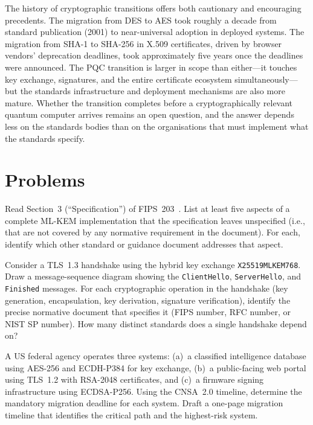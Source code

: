 The history of cryptographic transitions offers both cautionary and encouraging precedents. The migration from DES to AES took roughly a decade from standard publication (2001) to near-universal adoption in deployed systems. The migration from SHA-1 to SHA-256 in X.509 certificates, driven by browser vendors' deprecation deadlines, took approximately five years once the deadlines were announced. The PQC transition is larger in scope than either---it touches key exchange, signatures, and the entire certificate ecosystem simultaneously---but the standards infrastructure and deployment mechanisms are also more mature. Whether the transition completes before a cryptographically relevant quantum computer arrives remains an open question, and the answer depends less on the standards bodies than on the organisations that must implement what the standards specify.


\section*{Problems}

\begin{prob}
\label{prob:fips203-unspecified}
Read Section~3 (``Specification'') of FIPS~203~\cite{FIPS203}. List at least five aspects of a complete ML-KEM implementation that the specification leaves unspecified (i.e., that are not covered by any normative requirement in the document). For each, identify which other standard or guidance document addresses that aspect.
\end{prob}

\begin{prob}
\label{prob:tls-handshake-map}
Consider a TLS~1.3 handshake using the hybrid key exchange \texttt{X25519MLKEM768}. Draw a message-sequence diagram showing the \texttt{ClientHello}, \texttt{ServerHello}, and \texttt{Finished} messages. For each cryptographic operation in the handshake (key generation, encapsulation, key derivation, signature verification), identify the precise normative document that specifies it (FIPS number, RFC number, or NIST SP number). How many distinct standards does a single handshake depend on?
\end{prob}

\begin{prob}
\label{prob:cnsa-timeline}
A US federal agency operates three systems: (a)~a classified intelligence database using AES-256 and ECDH-P384 for key exchange, (b)~a public-facing web portal using TLS~1.2 with RSA-2048 certificates, and (c)~a firmware signing infrastructure using ECDSA-P256. Using the CNSA~2.0 timeline, determine the mandatory migration deadline for each system. Draft a one-page migration timeline that identifies the critical path and the highest-risk system.
\end{prob}

